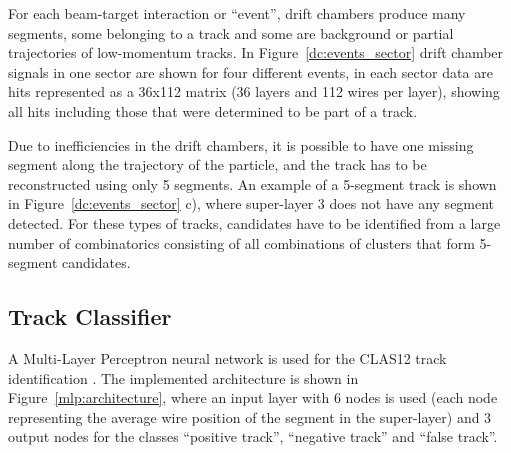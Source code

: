 \documentclass{webofc}
\begin{document}
For each beam-target interaction or ``event'', drift chambers produce many segments, some belonging 
to a track and some are background or partial trajectories of low-momentum tracks. In Figure~\ref{dc:events_sector} 
drift chamber signals in one sector are shown for four different  events, in each sector data are hits 
represented as a 36x112 matrix (36 layers and 112 wires per layer), showing all hits including those that 
were determined to be part of a track. 

Due to inefficiencies in the drift chambers, it is possible to have one missing segment along the trajectory 
of the particle, and the track has to be reconstructed using only 5 segments. An example of a 5-segment 
track is shown in Figure~\ref{dc:events_sector} c), where super-layer 3 does not have any segment detected. 
For these types of tracks, candidates have to be identified from a large number of combinatorics consisting 
of all combinations of clusters that form 5-segment candidates. 



 \subsection{Track Classifier}
 \label{track-classifier}
 
 
 A Multi-Layer Perceptron neural network is used for the CLAS12 track identification  \cite{Gavalian:2020oxg}. 
 The implemented architecture is shown in Figure~\ref{mlp:architecture}, where an input layer with 6 
 nodes is used (each node representing the average wire position of the segment in the super-layer) and 3 
 output nodes for the classes ``positive track'', ``negative track'' and ``false track''.
 
\end{document}
